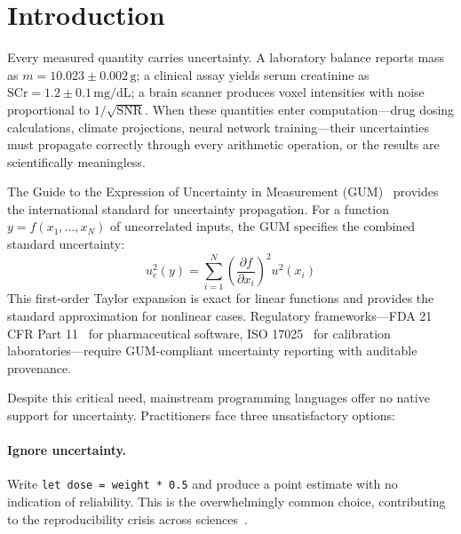 \documentclass[acmsmall,screen,review,anonymous]{acmart}
\begin{document}


\maketitle

\section{Introduction}
\label{sec:intro}

Every measured quantity carries uncertainty.
A laboratory balance reports mass as $m = 10.023 \pm 0.002\,\text{g}$;
a clinical assay yields serum creatinine as $\text{SCr} = 1.2 \pm 0.1\,\text{mg/dL}$;
a brain scanner produces voxel intensities with noise proportional
to $1/\sqrt{\text{SNR}}$.
When these quantities enter computation---drug dosing calculations,
climate projections, neural network training---their uncertainties must
propagate correctly through every arithmetic operation,
or the results are scientifically meaningless.

The Guide to the Expression of Uncertainty in Measurement
(GUM)~\cite{jcgm2008gum} provides the international standard for
uncertainty propagation.
For a function $y = f(x_1, \ldots, x_N)$ of uncorrelated inputs,
the GUM specifies the combined standard uncertainty:
\begin{equation}
  u_c^2(y) = \sum_{i=1}^{N} \left(\frac{\partial f}{\partial x_i}\right)^2 u^2(x_i)
  \label{eq:gum}
\end{equation}
This first-order Taylor expansion is exact for linear functions and
provides the standard approximation for nonlinear cases.
Regulatory frameworks---FDA 21 CFR Part 11~\cite{fda21cfr11} for pharmaceutical
software, ISO 17025~\cite{iso17025} for calibration laboratories---require
GUM-compliant uncertainty reporting with auditable provenance.

Despite this critical need, mainstream programming languages offer
no native support for uncertainty.
Practitioners face three unsatisfactory options:

\paragraph{Ignore uncertainty.}
Write \texttt{let dose = weight * 0.5} and produce a point estimate
with no indication of reliability.
This is the overwhelmingly common choice, contributing to the
reproducibility crisis across sciences~\cite{eklund2016cluster}.
\end{document}
